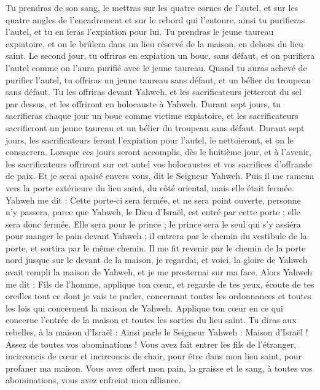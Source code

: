 \begin{multicols}{2}
Tu prendras de son sang, le mettras sur les quatre cornes de l'autel, et sur les quatre angles de l’encadrement et sur le rebord qui l’entoure, ainsi tu purifieras l'autel, et tu en feras l’expiation pour lui\FTNT{}.
Tu prendras le jeune taureau expiatoire, et on le brûlera dans un lieu réservé de la maison, en dehors du lieu saint.
Le second jour, tu offriras en expiation un bouc, sans défaut, et on purifiera l'autel comme on l'aura purifié avec le jeune taureau.
Quand tu auras achevé de purifier l'autel, tu offriras un jeune taureau sans défaut, et un bélier du troupeau sans défaut.
Tu les offriras devant Yahweh, et les sacrificateurs jetteront du sel par dessus, et les offriront en holocauste à Yahweh\FTNT{}.
Durant sept jours, tu sacrifieras chaque jour un bouc comme victime expiatoire, et les sacrificateurs sacrifieront un jeune taureau et un bélier du troupeau sans défaut.
Durant sept jours, les sacrificateurs feront l’expiation pour l'autel, le nettoieront, et on le consacrera.
Lorsque ces jours seront accomplis, dès le huitième jour, et à l’avenir, les sacrificateurs offriront sur cet autel vos holocaustes et vos sacrifices d’offrande de paix. Et je serai apaisé envers vous, dit le Seigneur Yahweh.
\VerseOne{}Puis il me ramena vers la porte extérieure du lieu saint, du côté oriental, mais elle était fermée.
Yahweh me dit : Cette porte-ci sera fermée, et ne sera point ouverte, personne n'y passera, parce que Yahweh, le Dieu d'Israël, est entré par cette porte ; elle sera donc fermée\FTNT{}.
Elle sera pour le prince ; le prince sera le seul qui s'y assiéra pour manger le pain devant Yahweh ; il entrera par le chemin du vestibule de la porte, et sortira par le même chemin.
Il me fit revenir par le chemin de la porte nord jusque sur le devant de la maison, je regardai, et voici, la gloire de Yahweh avait rempli la maison de Yahweh, et je me prosternai sur ma face.
Alors Yahweh me dit : Fils de l’homme, applique ton cœur, et regarde de tes yeux, écoute de tes oreilles tout ce dont je vais te  parler, concernant toutes les ordonnances et toutes les lois qui concernent la maison de Yahweh. Applique ton cœur en ce qui concerne l'entrée de la maison et toutes les sorties du lieu saint.
Tu diras aux rebelles, à la maison d'Israël : Ainsi parle le Seigneur Yahweh : Maison d'Israël ! Assez de toutes vos abominations !
Vous avez fait entrer les fils de l'étranger, incirconcis de cœur et incirconcis de chair, pour être dans mon lieu saint, pour profaner ma maison. Vous avez offert mon pain, la graisse et le sang, à toutes vos abominations, vous avez enfreint mon alliance\FTNT{}.

\end{multicols}
